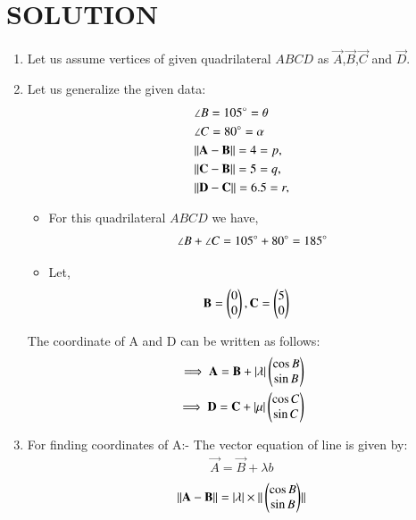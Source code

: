 \documentclass[journal,12pt,twocolumn]{IEEEtran}
\begin{document}
\section{SOLUTION}
\begin{enumerate}
\item Let us assume vertices of given quadrilateral $ABCD$ as $\vec{A}$,$\vec{B}$,$\vec{C}$ and $\vec{D}$.
\item Let us generalize the given data:
    \begin{align}
    &\angle B= 105\degree=\theta \label{eq1}
    \\
    &\angle C= 80\degree=\alpha \label{eq2}
    \\
    &\Vert\mathbf{A}-\mathbf{B}\rVert =4=p, \label{eq3}
    \\
    &\Vert\mathbf{C}-\mathbf{B}\rVert =5=q,\label{eq4}
    \\
     &\Vert\mathbf{D}-\mathbf{C}\rVert =6.5=r,\label{eq5}
    \end{align}
\begin{itemize}
\item For this quadrilateral $ABCD$ we have,
\begin{align}
\angle B +\angle C = 105\degree + 80\degree =185\degree
\end{align}
\item Let, \begin{align}
    &\mathbf{B}=\begin{pmatrix}0\\0\end{pmatrix}, \mathbf{C}=\begin{pmatrix}5\\0\end{pmatrix} \label{eq6}
\end{align}
\end{itemize}
\begin{lemma}
\label{lemma}
The coordinate of A and D can be written as follows:
\begin{align}
\implies \mathbf{A}=\mathbf{B} + \vert\lambda\vert \begin{pmatrix}\cos B \\\sin B \end{pmatrix} \label{eq a}
\\
\implies \mathbf{D}=\mathbf{C} + \vert\mu\vert \begin{pmatrix}\cos C\\\sin C \end{pmatrix} \label{eq b}
\end{align}
\end{lemma}
\item For finding coordinates of A:-
The vector equation of line is given by:
\begin{align}
\vec{A}=\vec{B} + \lambda b \label{eq7}
\end{align}
\begin{align}
\norm{\vec{A}-\vec{B}}= \abs{\lambda}\times\norm{\myvec{\cos B\\\sin B}} 

\end{align}
\end{enumerate}
\end{document}
